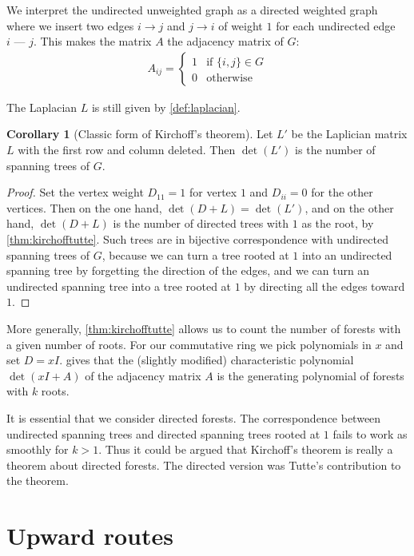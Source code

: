 \documentclass[a4paper, 11pt]{article}
\theoremstyle{definition}
\newtheorem{corollary}{Corollary}[theorem]
\begin{document}
We interpret the undirected unweighted graph as a directed weighted graph where we insert two edges $i \xrightarrow{} j$ and $j \xrightarrow{} i$ of weight $1$ for each undirected edge $i \text{ --- } j$. This makes the matrix $A$ the adjacency matrix of $G$:
\begin{align*}
  A_{ij} = \begin{cases}
    1 & \text{if } \{i,j\} \in G \\
    0 & \text{otherwise}
  \end{cases}
\end{align*}

The Laplacian $L$ is still given by \cref{def:laplacian}.

\begin{corollary}[Classic form of Kirchoff's theorem]
  Let $L'$ be the Laplician matrix $L$ with the first row and column deleted.
  Then $\det(L')$ is the number of spanning trees of $G$.
\end{corollary}
\begin{proof}
  Set the vertex weight $D_{11} = 1$ for vertex $1$ and $D_{ii} = 0$ for the other vertices. Then on the one hand, $\det(D+L) = \det(L')$, and on the other hand,  $\det(D+L)$ is the number of directed trees with $1$ as the root, by \cref{thm:kirchofftutte}. Such trees are in bijective correspondence with undirected spanning trees of $G$, because we can turn a tree rooted at $1$ into an undirected spanning tree by forgetting the direction of the edges, and we can turn an undirected spanning tree into a tree rooted at $1$ by directing all the edges toward $1$.
\end{proof}

More generally, \cref{thm:kirchofftutte} allows us to count the number of forests with a given number of roots. For our commutative ring we pick polynomials in $x$ and set $D = xI$.  gives that the (slightly modified) characteristic polynomial $\det(xI + A)$ of the adjacency matrix $A$ is the generating polynomial of forests with $k$ roots.

It is essential that we consider directed forests. The correspondence between undirected spanning trees and directed spanning trees rooted at $1$ fails to work as smoothly for $k > 1$. Thus it could be argued that Kirchoff's theorem is really a theorem about directed forests. The directed version was Tutte's contribution to the theorem.

\section{Upward routes}
\end{document}
